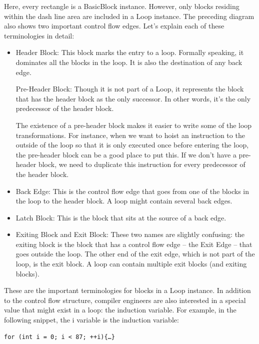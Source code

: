 Here, every rectangle is a BasicBlock instance. However, only blocks residing within the dash line area are included in a Loop instance. The preceding diagram also shows two important control flow edges. Let's explain each of these terminologies in detail:

\begin{itemize}
\item Header Block: This block marks the entry to a loop. Formally speaking, it dominates all the blocks in the loop. It is also the destination of any back edge.

Pre-Header Block: Though it is not part of a Loop, it represents the block that has the header block as the only successor. In other words, it's the only predecessor of the header block.

The existence of a pre-header block makes it easier to write some of the loop transformations. For instance, when we want to hoist an instruction to the outside of the loop so that it is only executed once before entering the loop, the pre-header block can be a good place to put this. If we don't have a pre-header block, we need to duplicate this instruction for every predecessor of the header block.

\item Back Edge: This is the control flow edge that goes from one of the blocks in the loop to the header block. A loop might contain several back edges.

\item Latch Block: This is the block that sits at the source of a back edge.

\item Exiting Block and Exit Block: These two names are slightly confusing: the exiting block is the block that has a control flow edge – the Exit Edge – that goes outside the loop. The other end of the exit edge, which is not part of the loop, is the exit block. A loop can contain multiple exit blocks (and exiting blocks).
\end{itemize}

These are the important terminologies for blocks in a Loop instance. In addition to the control flow structure, compiler engineers are also interested in a special value that might exist in a loop: the induction variable. For example, in the following snippet, the i variable is the induction variable:

\begin{lstlisting}[style=styleCXX]
for (int i = 0; i < 87; ++i){…}
\end{lstlisting}

